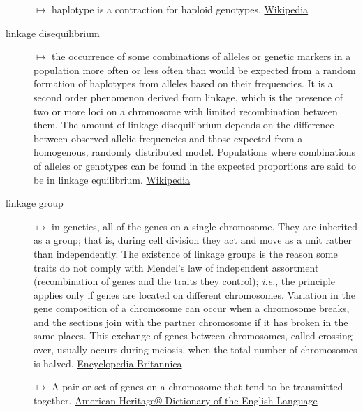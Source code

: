 \documentclass[letterpaper]{scrartcl}
\begin{document}
\begin{description}
\(\mapsto\) haplotype is a contraction for haploid genotypes.
\href{link_addresshttp://en.wikipedia.org/wiki/Haplotype}{Wikipedia}
\item[linkage disequilibrium]
\(\mapsto\) the occurrence of some combinations of alleles or genetic
markers in a population more often or less often than would be expected
from a random formation of haplotypes from alleles based on their
frequencies. It is a second order phenomenon derived from linkage, which
is the presence of two or more loci on a chromosome with limited
recombination between them. The amount of linkage disequilibrium depends
on the difference between observed allelic frequencies and those
expected from a homogenous, randomly distributed model. Populations
where combinations of alleles or genotypes can be found in the expected
proportions are said to be in linkage equilibrium.
\href{http://en.wikipedia.org/wiki/Linkage_disequilibrium}{Wikipedia}
\item[linkage group]
\(\mapsto\) in genetics, all of the genes on a single chromosome. They
are inherited as a group; that is, during cell division they act and
move as a unit rather than independently. The existence of linkage
groups is the reason some traits do not comply with Mendel's law of
independent assortment (recombination of genes and the traits they
control); \emph{i.e.}, the principle applies only if genes are located
on different chromosomes. Variation in the gene composition of a
chromosome can occur when a chromosome breaks, and the sections join
with the partner chromosome if it has broken in the same places. This
exchange of genes between chromosomes, called crossing over, usually
occurs during meiosis, when the total number of chromosomes is halved.
\href{http://www.britannica.com/EBchecked/topic/342478/linkage-group}{Encyclopedia
Britannica}

\(\mapsto\) A pair or set of genes on a chromosome that tend to be
transmitted together.
\href{http://www.thefreedictionary.com/linkage+group}{American Heritage®
Dictionary of the English Language}
\end{description}
\end{document}
